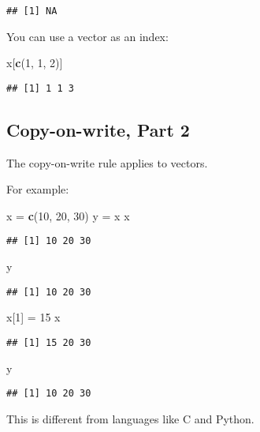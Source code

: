 \documentclass[
]{article}
\newenvironment{Shaded}{\begin{snugshade}}{\end{snugshade}}
\newcommand{\DecValTok}[1]{\textcolor[rgb]{0.00,0.00,0.81}{#1}}
\newcommand{\KeywordTok}[1]{\textcolor[rgb]{0.13,0.29,0.53}{\textbf{#1}}}
\newcommand{\NormalTok}[1]{#1}
\newcommand{\StringTok}[1]{\textcolor[rgb]{0.31,0.60,0.02}{#1}}
\begin{document}
\begin{verbatim}
## [1] NA
\end{verbatim}

You can use a vector as an index:

\begin{Shaded}
\begin{Highlighting}[]
\NormalTok{x[}\KeywordTok{c}\NormalTok{(}\DecValTok{1}\NormalTok{, }\DecValTok{1}\NormalTok{, }\DecValTok{2}\NormalTok{)]}
\end{Highlighting}
\end{Shaded}

\begin{verbatim}
## [1] 1 1 3
\end{verbatim}

\hypertarget{copy-on-write-part-2}{%
\subsection{Copy-on-write, Part 2}\label{copy-on-write-part-2}}

The copy-on-write rule applies to vectors.

For example:

\begin{Shaded}
\begin{Highlighting}[]
\NormalTok{x =}\StringTok{ }\KeywordTok{c}\NormalTok{(}\DecValTok{10}\NormalTok{, }\DecValTok{20}\NormalTok{, }\DecValTok{30}\NormalTok{)}
\NormalTok{y =}\StringTok{ }\NormalTok{x}
\NormalTok{x}
\end{Highlighting}
\end{Shaded}

\begin{verbatim}
## [1] 10 20 30
\end{verbatim}

\begin{Shaded}
\begin{Highlighting}[]
\NormalTok{y}
\end{Highlighting}
\end{Shaded}

\begin{verbatim}
## [1] 10 20 30
\end{verbatim}

\begin{Shaded}
\begin{Highlighting}[]
\NormalTok{x[}\DecValTok{1}\NormalTok{] =}\StringTok{ }\DecValTok{15}
\NormalTok{x}
\end{Highlighting}
\end{Shaded}

\begin{verbatim}
## [1] 15 20 30
\end{verbatim}

\begin{Shaded}
\begin{Highlighting}[]
\NormalTok{y}
\end{Highlighting}
\end{Shaded}

\begin{verbatim}
## [1] 10 20 30
\end{verbatim}

This is different from languages like C and Python.
\end{document}
